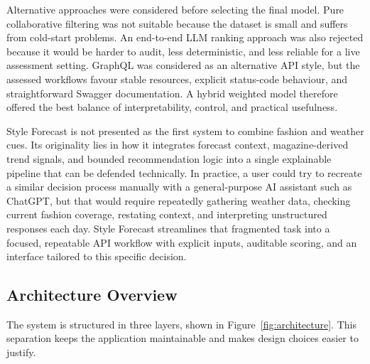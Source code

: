 \documentclass[11pt,a4paper]{article}
\begin{document}
Alternative approaches were considered before selecting the final model. Pure collaborative filtering was not suitable because the dataset is small and suffers from cold-start problems. An end-to-end LLM ranking approach was also rejected because it would be harder to audit, less deterministic, and less reliable for a live assessment setting. GraphQL was considered as an alternative API style, but the assessed workflows favour stable resources, explicit status-code behaviour, and straightforward Swagger documentation. A hybrid weighted model therefore offered the best balance of interpretability, control, and practical usefulness.

Style Forecast is not presented as the first system to combine fashion and weather cues. Its originality lies in how it integrates forecast context, magazine-derived trend signals, and bounded recommendation logic into a single explainable pipeline that can be defended technically. In practice, a user could try to recreate a similar decision process manually with a general-purpose AI assistant such as ChatGPT, but that would require repeatedly gathering weather data, checking current fashion coverage, restating context, and interpreting unstructured responses each day. Style Forecast streamlines that fragmented task into a focused, repeatable API workflow with explicit inputs, auditable scoring, and an interface tailored to this specific decision.

\subsection{Architecture Overview}
The system is structured in three layers, shown in Figure~\ref{fig:architecture}. This separation keeps the application maintainable and makes design choices easier to justify.
\end{document}
